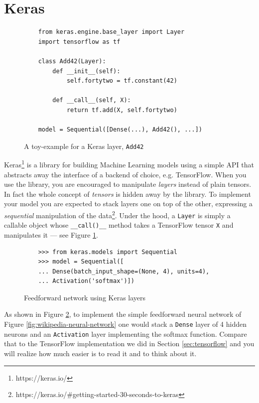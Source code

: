 \section{Keras}
\label{sec:keras}

\begin{figure}
  \begin{verbatim}
    from keras.engine.base_layer import Layer
    import tensorflow as tf

    class Add42(Layer):
        def __init__(self):
            self.fortytwo = tf.constant(42)

        def __call__(self, X):
            return tf.add(X, self.fortytwo)

    model = Sequential([Dense(...), Add42(), ...])
  \end{verbatim}
  \caption{A toy-example for a Keras layer, \texttt{Add42}}
  \label{fig:toy-layer}
\end{figure}

Keras\footnote{https://keras.io/} is a library for building Machine
Learning models using a simple API that abstracts away the interface of
a backend of choice, e.g. TensorFlow. When you use the library, you are
encouraged to manipulate \emph{layers} instead of plain tensors. In
fact the whole concept of \emph{tensors} is hidden away by the library.
To implement your model you are expected to stack layers one on top of the
other, expressing a \emph{sequential} manipulation of the
data\footnote{https://keras.io/\#getting-started-30-seconds-to-keras}.
Under the hood, a \texttt{Layer} is simply a callable object whose
\texttt{\_\_call()\_\_} method takes a TensorFlow tensor \texttt{X} and
manipulates it --- see Figure \ref{fig:toy-layer}.

\begin{figure}
  \begin{verbatim}
    >>> from keras.models import Sequential
    >>> model = Sequential([
    ... Dense(batch_input_shape=(None, 4), units=4),
    ... Activation('softmax')])
  \end{verbatim}
  \caption{Feedforward network using Keras layers}
  \label{fig:feedforward-with-layers}
\end{figure}

As shown in Figure \ref{fig:feedforward-with-layers}, to implement the
simple feedforward neural network of Figure
\ref{fig:wikipedia-neural-network} one would stack a \texttt{Dense}
layer of 4 hidden neurons and an \texttt{Activation} layer implementing
the softmax function. Compare that to the TensorFlow implementation we
did in Section \ref{sec:tensorflow} and you will realize how much easier
is to read it and to think about it.

